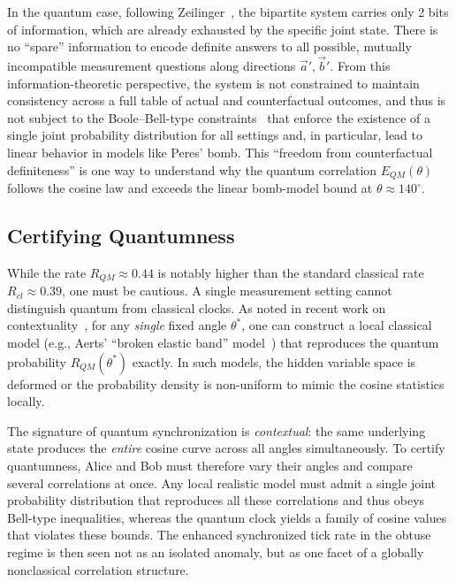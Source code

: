 \documentclass[entropy,article,submit,moreauthors,pdftex]{Definitions/mdpi}
\begin{document}
In the quantum case, following Zeilinger~\cite{zeil-99}, the bipartite system carries only 2 bits of information, which are already exhausted by the specific joint state. There is no ``spare'' information to encode definite answers to all possible, mutually incompatible measurement questions along directions $\vec{a}',\vec{b}'$. From this information-theoretic perspective, the system is not constrained to maintain consistency across a full table of actual and counterfactual outcomes, and thus is not subject to the Boole--Bell-type constraints~\cite{froissart-81,pitowsky-86} that enforce the existence of a single joint probability distribution for all settings and, in particular, lead to linear behavior in models like Peres' bomb. This ``freedom from counterfactual definiteness'' is one way to understand why the quantum correlation $E_{QM}(\theta)$ follows the cosine law and exceeds the linear bomb-model bound at $\theta \approx 140^\circ$.


\subsection{Certifying Quantumness}
While the rate $R_{QM} \approx 0.44$ is notably higher than the standard classical rate $R_{cl} \approx 0.39$, one must be cautious. A single measurement setting cannot distinguish quantum from classical clocks. As noted in recent work on contextuality~\cite{svozil-2022-epr}, for any \emph{single} fixed angle $\theta^*$, one can construct a local classical model (e.g., Aerts' ``broken elastic band'' model~\cite{aerts-69}) that reproduces the quantum probability $R_{QM}(\theta^*)$ exactly. In such models, the hidden variable space is deformed or the probability density is non-uniform to mimic the cosine statistics locally.

The signature of quantum synchronization is \emph{contextual}: the same underlying state produces the \emph{entire} cosine curve across all angles simultaneously. To certify quantumness, Alice and Bob must therefore vary their angles and compare several correlations at once. Any local realistic model must admit a single joint probability distribution that reproduces all these correlations and thus obeys Bell-type inequalities, whereas the quantum clock yields a family of cosine values that violates these bounds. The enhanced synchronized tick rate in the obtuse regime is then seen not as an isolated anomaly, but as one facet of a globally nonclassical correlation structure.
\end{document}
